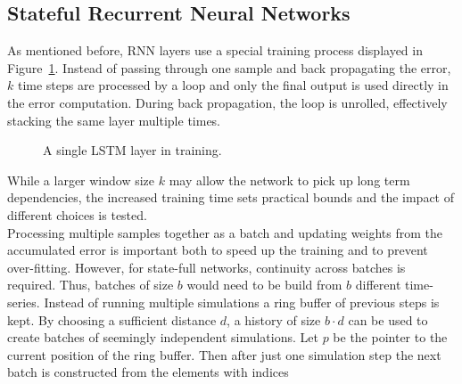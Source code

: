\documentclass[sigconf]{acmart}
\begin{document}
\subsection{Stateful Recurrent Neural Networks}
As mentioned before, RNN layers use a special training process displayed in Figure~\ref{rnnTraining}. Instead of passing through one sample and back propagating the error, $k$ time steps are processed by a loop and only the final output is used directly in the error computation. During back propagation, the loop is unrolled, effectively stacking the same layer multiple times. 
\begin{figure}
	\caption{A single LSTM layer in training.}
	\label{rnnTraining}
\end{figure}
While a larger window size $k$ may allow the network to pick up long term dependencies, the increased training time sets practical bounds and the impact of different choices is tested.\\
Processing multiple samples together as a batch and updating weights from the accumulated error is important both to speed up the training and to prevent over-fitting. However, for state-full networks, continuity across batches is required. Thus, batches of size $b$ would need to be build from $b$ different time-series. Instead of running multiple simulations a ring buffer of previous steps is kept. By choosing a sufficient distance $d$, a history of size $b \cdot d$ can be used to create batches of seemingly independent simulations. Let $p$ be the pointer to the current position of the ring buffer. Then after just one simulation step the next batch is constructed from the elements with indices
\end{document}
